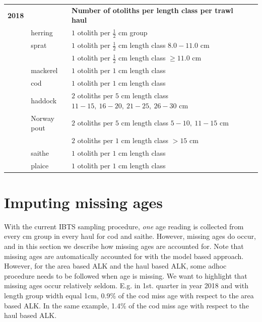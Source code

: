 \documentclass[a4paper 12pt]{article}
\numberwithin{equation}{section}
\begin{document}
\begin{small}
\begin{table}[h!]
\begin{tabularx}{\linewidth}{r l l l l X}
{\bf 2018} & & {\bf Number of otoliths per length class per trawl haul}  \\[1.0ex]
  & herring  &  $1$  otolith per $\frac{1}{2}$ cm group \\[0.5ex]
     & sprat    & $1$  otolith per $\frac{1}{2}$ cm length class  $8.0 -11.0$ cm\\[0.5ex]
              & & $1$  otolith per $\frac{1}{2}$ cm length class  $\geq 11.0$ cm\\[0.5ex]
& mackerel      & $1$  otolith per $1$ cm length class \\[0.5ex]
& cod       	  & $1$  otolith per $1$ cm length class\\[0.5ex]
& haddock & $2$  otoliths per $5$ cm length class $11 -15, \ 16-20, \ 21-25, \ 26-30$ cm \\[0.5ex]
& Norway pout & $2$  otoliths per $5$ cm length class $5 -10, \ 11-15$ cm\\[0.5ex]
               & & $2$  otoliths per $1$ cm length class $> 15$ cm\\[1.0ex]
&saithe        & $1$  otolith per $1$ cm length class \\[0.5ex]  
&plaice       & $1$  otolith per $1$ cm length class \\[0.1ex]
\bottomrule         
\end{tabularx}
\end{table}
\end{small}

 \clearpage
\section{\large Imputing missing ages}
\label{sec:imputationappendix}
With the current IBTS sampling procedure, \textit{one} age reading is collected from every cm group in every haul for cod and saithe. However, missing ages do occur, and in this section we describe how missing ages are accounted for. Note that missing ages are automatically accounted for with the model based approach. However, for the area based ALK and the haul based ALK, some adhoc procedure needs to be followed when age is missing. We want to highlight that missing ages occur relatively seldom. E.g. in 1st. quarter in year 2018 and with length group width equal 1cm, 0.9\% of the cod miss age with respect to the area based ALK. In the same example, 1.4\% of the cod miss age with respect to the haul based ALK.
\end{document}
